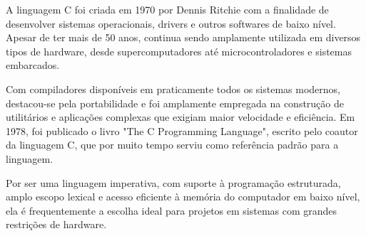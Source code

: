 A linguagem C foi criada em 1970 por Dennis Ritchie com a finalidade de 
desenvolver sistemas operacionais, drivers e outros softwares de baixo nível. 
Apesar de ter mais de 50 anos, continua sendo amplamente utilizada em diversos 
tipos de hardware, desde supercomputadores até microcontroladores e sistemas 
embarcados.

Com compiladores disponíveis em praticamente todos os sistemas modernos, 
destacou-se pela portabilidade e foi amplamente empregada na construção de 
utilitários e aplicações complexas que exigiam maior velocidade e eficiência. 
Em 1978, foi publicado o livro "The C Programming Language", escrito pelo 
coautor da linguagem C, que por muito tempo serviu como referência padrão para 
a linguagem.

Por ser uma linguagem imperativa, com suporte à programação estruturada, 
amplo escopo lexical e acesso eficiente à memória do computador em baixo 
nível, ela é frequentemente a escolha ideal para projetos em sistemas com 
grandes restrições de hardware.
